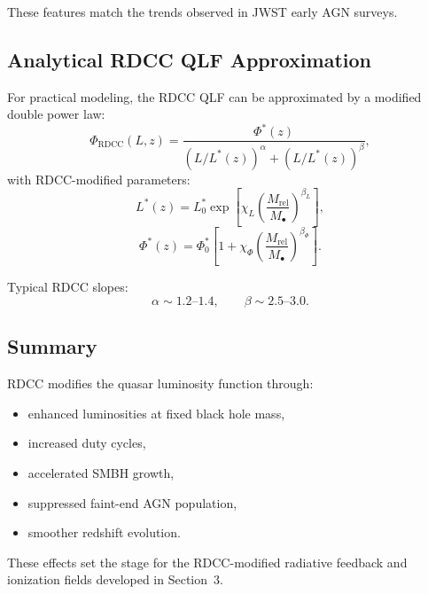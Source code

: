 \documentclass[11pt,a4paper]{article}
\begin{document}
These features match the trends observed in JWST early AGN surveys.

\subsection{Analytical RDCC QLF Approximation}

For practical modeling, the RDCC QLF can be approximated by a modified double power law:
\begin{equation}
\Phi_{\mathrm{RDCC}}(L,z)
=
\frac{\Phi^{\ast}(z)}
{\left(L/L^{\ast}(z)\right)^{\alpha}
+
\left(L/L^{\ast}(z)\right)^{\beta}},
\end{equation}
with RDCC-modified parameters:
\begin{equation}
L^{\ast}(z)
=
L^{\ast}_{0}
\exp\!\left[
\chi_{L}
\left(
\frac{M_{\mathrm{rel}}}{M_{\bullet}}
\right)^{\beta_{L}}
\right],
\end{equation}
\begin{equation}
\Phi^{\ast}(z)
=
\Phi^{\ast}_{0}
\left[
1
+
\chi_{\Phi}
\left(
\frac{M_{\mathrm{rel}}}{M_{\bullet}}
\right)^{\beta_{\Phi}}
\right].
\end{equation}

Typical RDCC slopes:
\begin{equation}
\alpha \sim 1.2\text{--}1.4,
\qquad
\beta \sim 2.5\text{--}3.0.
\end{equation}

\subsection{Summary}

RDCC modifies the quasar luminosity function through:
\begin{itemize}
\item enhanced luminosities at fixed black hole mass,
\item increased duty cycles,
\item accelerated SMBH growth,
\item suppressed faint-end AGN population,
\item smoother redshift evolution.
\end{itemize}

These effects set the stage for the RDCC-modified radiative feedback and ionization fields
developed in Section~3.

\end{document}

